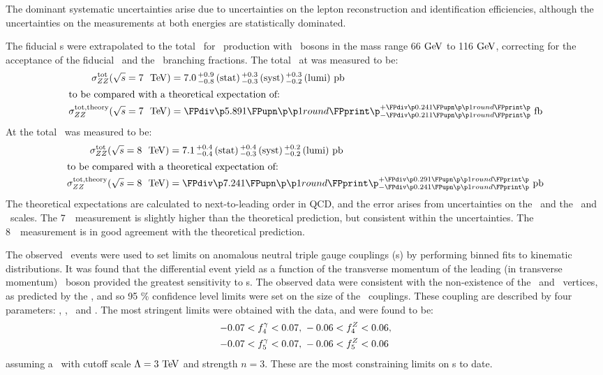 The dominant systematic uncertainties arise due to uncertainties on the lepton
reconstruction and identification efficiencies, although the uncertainties on
the measurements at both energies are statistically dominated.

The fiducial \cx s were extrapolated to the total \cx\ for \ZZ\
production with \Z\ bosons in the mass range 66$\GeV$ to 116$\GeV$, 
correcting for the acceptance of the fiducial \phasespace\ and the \Zll\
branching fractions. The total \cx\ at  was measured to be:
\begin{align}
\sigmaTotZZ(\sqrtseq{7}) &= \ZZSevenTeVTotalCrossSection \\
\intertext{to be compared with a theoretical expectation of:}
\sigmaTotTheoryZZ(\sqrtseq{7}) &= \ZZSevenTeVTheoryTotalCrossSection
\end{align}
At \sqrtseq{8} the total \cx\ was measured to be:
\begin{align}
\sigmaTotZZ(\sqrtseq{8}) &= \ZZEightTeVTotalCrossSection \\
\intertext{to be compared with a theoretical expectation of:}
\sigmaTotTheoryZZ(\sqrtseq{8}) &= \ZZEightTeVTheoryTotalCrossSection
\end{align}
The theoretical expectations are calculated to next-to-leading order in QCD, and
the error arises from uncertainties on the \partDF\ and the \fact\ and \renorm\
scales. The 7~\tev\ measurement is slightly higher than the theoretical prediction,
but consistent within the uncertainties. The 8~\tev\ measurement is in good
agreement with the theoretical prediction. 

The observed \ZZllll\ events were used to set limits on anomalous neutral triple
gauge couplings (\TGC s) by performing binned fits to kinematic distributions.
It was found that the differential event yield as a function of the transverse
momentum of the leading (in transverse momentum) \Z\ boson provided the
greatest sensitivity to \TGC s. The observed data were consistent with the non-existence of the
\ZZZ\ and \ZZg\ vertices, as predicted by the \sm, and so 95 \% confidence level
limits were set on the size of the \TGC\ couplings. These coupling are
described by four parameters: \ffourg, \ffourZ, \ffiveg\ and \ffiveZ. The
most stringent limits were obtained with the \sqrtseq{8} data, and were found to
be:
\begin{align}
-0.07 < f_{4}^{\gamma} < 0.07, &\; -0.06 < f_{4}^{Z} < 0.06, \nonumber \\
-0.07 < f_{5}^{\gamma} < 0.07, &\; -0.06 < f_{5}^{Z} < 0.06
\end{align}
assuming a \formfactor\ with cutoff scale $\Lambda=3 \tev$ and strength $n=3$.
These are the most constraining limits on \TGC s to date.
